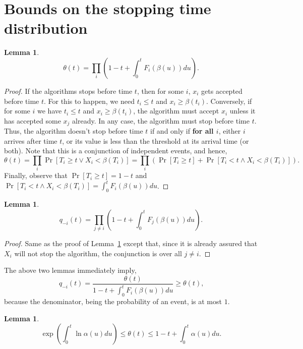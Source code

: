 \documentclass[10pt, letterpaper, twoside]{article}
\newtheorem{lemma}[theorem]{Lemma}
\begin{document}
\section{Bounds on the stopping time distribution}

\begin{lemma}\label{lem_theta}
\[\theta(t)=\prod_i\left(1-t+\int_0^tF_i(\beta(u))du\right)\text{.}\]
\end{lemma}

\begin{proof}
If the algorithms stops before time $t$, then for some $i$, $x_i$ gets accepted before time $t$. For this to happen, we need $t_i\leq t$ and $x_i\geq\beta(t_i)$. Conversely, if for some $i$ we have $t_i\leq t$ and $x_i\geq\beta(t_i)$, the algorithm must accept $x_i$ unless it has accepted some $x_j$ already. In any case, the algorithm must stop before time $t$. Thus, the algorithm doesn't stop before time $t$ if and only if \textbf{for all $i$}, either $i$ arrives after time $t$, or its value is less than the threshold at its arrival time (or both). Note that this is a conjunction of independent events, and hence,
\[\theta(t)=\prod_i\Pr[T_i\geq t\vee X_i<\beta(T_i)]=\prod_i\left(\Pr[T_i\geq t]+\Pr[T_i<t\wedge X_i<\beta(T_i)]\right)\text{.}\]
Finally, observe that $\Pr[T_i\geq t]=1-t$ and $\Pr[T_i<t\wedge X_i<\beta(T_i)]=\int_0^tF_i(\beta(u))du$.
\end{proof}

\begin{lemma}
\[q_{-i}(t)=\prod_{j\neq i}\left(1-t+\int_0^tF_j(\beta(u))du\right)\text{.}\]
\end{lemma}

\begin{proof}
Same as the proof of Lemma~\ref{lem_theta} except that, since it is already assured that $X_i$ will not stop the algorithm, the conjunction is over all $j\neq i$.
\end{proof}

The above two lemmas immediately imply,
\begin{equation}\label{eqn_q_theta}
q_{-i}(t)=\frac{\theta(t)}{1-t+\int_0^tF_i(\beta(u))du}\geq\theta(t)\text{,}
\end{equation}
because the denominator, being the probability of an event, is at most $1$.

\begin{lemma}\label{lem_theta_bounds}
\[\exp\left(\int_0^t\ln\alpha(u)du\right)\leq\theta(t)\leq1-t+\int_0^t\alpha(u)du\text{.}\]
\end{lemma}
\end{document}
